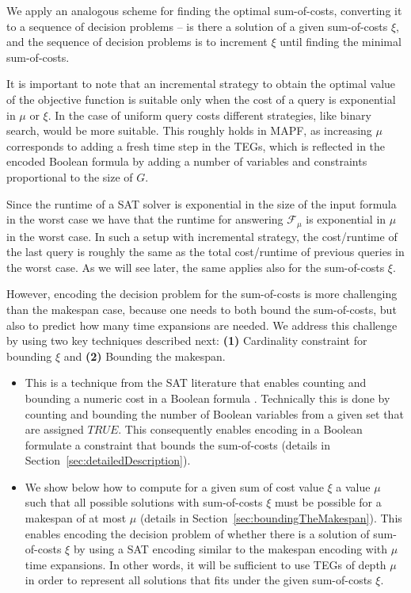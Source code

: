 \documentclass[jair,oneside,11pt]{article}
\begin{document}
We apply an analogous scheme for finding the optimal sum-of-costs, converting it to a sequence of decision problems -- is there a solution of a given sum-of-costs $\xi$, and the sequence of decision problems is to increment $\xi$ until finding the minimal sum-of-costs.

It is important to note that an incremental strategy to obtain the optimal value of the objective function is suitable only when the cost of a query is exponential in $\mu$ or $\xi$. In the case of uniform query costs different strategies, like binary search, would be more suitable. This roughly holds in MAPF, as increasing $\mu$ corresponds to adding a fresh time step in the TEGs, which is reflected in the encoded Boolean formula by adding a number of variables and constraints proportional to the size of $G$.

Since the runtime of a SAT solver is exponential in the size of the input formula in the worst case we have that the runtime for answering $\mathcal{F}_{\mu}$ is exponential in $\mu$ in the worst case. In such a setup with incremental strategy, the cost/runtime of the last query is roughly the same as the total cost/runtime of previous queries in the worst case.  As we will see later, the same applies also for the sum-of-costs $\xi$.

However, encoding the decision problem for the sum-of-costs is more challenging than the makespan case, because one needs to both bound the sum-of-costs, but also to predict how many time expansions are needed. We address this challenge by using two key techniques described next: {\bf (1)} Cardinality constraint for bounding $\xi$ and {\bf (2)} Bounding the makespan.


\begin{itemize}
\item{
 This is a technique from the SAT literature that enables counting and bounding a numeric cost in a Boolean formula \cite{DBLP:conf/cp/BailleuxB03,DBLP:conf/cp/SilvaL07,DBLP:conf/cp/Sinz05}. Technically this is done by counting and bounding the number of Boolean variables from a given set that are assigned $\mathit{TRUE}$. This consequently enables encoding in a Boolean formulate a constraint that bounds the sum-of-costs (details in Section~\ref{sec:detailedDescription}).
}

\item{
  We show below how to compute for a given sum of cost value $\xi$ a value $\mu$ such that all possible solutions with sum-of-costs $\xi$ must be possible for a makespan of at most $\mu$ (details in Section~\ref{sec:boundingTheMakespan}). This enables encoding the decision problem of whether there is a solution of sum-of-costs $\xi$ by using a SAT encoding similar to the makespan encoding with $\mu$ time expansions. In other words, it will be sufficient to use TEGs of depth $\mu$ in order to represent all solutions that fits under the given sum-of-costs $\xi$.
}
\end{itemize}
\end{document}
